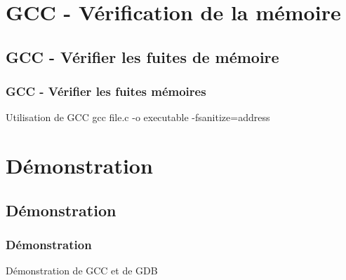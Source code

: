 \documentclass[8pt]{beamer}
\begin{document}




\section{GCC - Vérification de la mémoire} %
\label{sec:gcc_v_rification_de_la_m_moire}

\subsection{GCC - Vérifier les fuites de mémoire} %
\label{sub:gcc_v_rifier_les_fuites_de_m_moire}

\begin{frame}
\frametitle{GCC - Vérifier les fuites mémoires}
\begin{block}{Utilisation de GCC}
	gcc file.c -o executable -fsanitize=address
\end{block}
\end{frame}



\section{Démonstration} %
\label{sec:d_monstration}

\subsection{Démonstration} %
\label{sub:d_monstration}

\begin{frame}
\frametitle{Démonstration}

Démonstration de GCC et de GDB

\end{frame}


\end{document}
